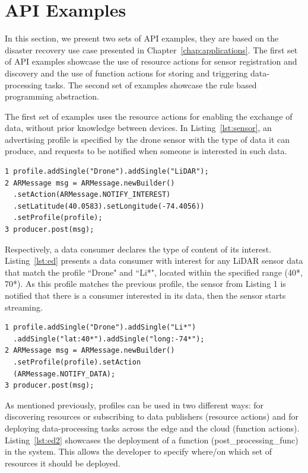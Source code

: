 \section{API Examples}
In this section, we present two sets of API examples, they are based on the disaster recovery use case presented in Chapter~\ref{chap:applications}. The first set of API examples showcase the use of resource actions for sensor registration and discovery and the use of function actions for storing and triggering data-processing tasks. The second set of examples showcase the rule based programming abstraction.

The first set of examples uses the resource actions for enabling the exchange of data, without prior knowledge between devices. In Listing~\ref{lst:sensor}, an advertising profile is specified by the drone sensor with the type of data it can produce, and requests to be notified when someone is interested in such data.

\begin{lstlisting}[language=mylang, caption={Data producer resource profile sample code.}, captionpos=b, label={lst:sensor}]
1 profile.addSingle("Drone").addSingle("LiDAR");
2 ARMessage msg = ARMessage.newBuilder()
  .setAction(ARMessage.NOTIFY_INTEREST)
  .setLatitude(40.0583).setLongitude(-74.4056))
  .setProfile(profile);
3 producer.post(msg);
\end{lstlisting}

Respectively, a data consumer declares the type of content of its interest. Listing~\ref{lst:ed} presents a data consumer with interest for any LiDAR sensor data that match the profile ``Drone" and ``Li*", located within the specified range (40*, 70*). As this profile matches the previous profile, the sensor from Listing 1 is notified that there is a consumer interested in its data, then the sensor starts streaming.

\begin{lstlisting}[language=mylang, caption={Data consumer resource profile sample code.}, captionpos=b, label={lst:ed}]
1 profile.addSingle("Drone").addSingle("Li*")
  .addSingle("lat:40*").addSingle("long:-74*");
2 ARMessage msg = ARMessage.newBuilder()
  .setProfile(profile).setAction
  (ARMessage.NOTIFY_DATA);
3 producer.post(msg);
\end{lstlisting}

As mentioned previously, profiles can be used in two different ways: for discovering resources or subscribing to
data publishers (resource actions) and for deploying data-processing tasks across the edge and the cloud (function
actions). Listing~\ref{lst:ed2} showcases the deployment of a function (post\_processing\_func) in the system. This allows the developer to specify where/on which set of resources it should be deployed.

